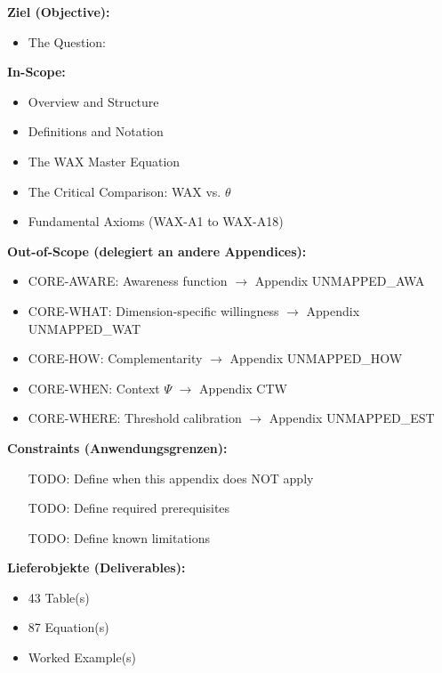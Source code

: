 

\begin{tcolorbox}[
    colback=orange!5!white,
    colframe=orange!75!black,
    title={\textbf{Appendix Scope: Ziel / In-Scope / Out-of-Scope / Constraints}},
    fonttitle=\bfseries
]

\textbf{Ziel (Objective):}
\begin{itemize}[nosep]
    \item The Question:
\end{itemize}

\textbf{In-Scope:}
\begin{itemize}[nosep]
    \item Overview and Structure
    \item Definitions and Notation
    \item The WAX Master Equation
    \item The Critical Comparison: WAX vs. $\theta$
    \item Fundamental Axioms (WAX-A1 to WAX-A18)
\end{itemize}

\textbf{Out-of-Scope (delegiert an andere Appendices):}
\begin{itemize}[nosep]
    \item CORE-AWARE: Awareness function $\rightarrow$ Appendix UNMAPPED_AWA
    \item CORE-WHAT: Dimension-specific willingness $\rightarrow$ Appendix UNMAPPED_WAT
    \item CORE-HOW: Complementarity $\rightarrow$ Appendix UNMAPPED_HOW
    \item CORE-WHEN: Context $\Psi$ $\rightarrow$ Appendix CTW
    \item CORE-WHERE: Threshold calibration $\rightarrow$ Appendix UNMAPPED_EST
\end{itemize}

\textbf{Constraints (Anwendungsgrenzen):}
\begin{itemize}[nosep]
    \item [TODO: Define when this appendix does NOT apply]
    \item [TODO: Define required prerequisites]
    \item [TODO: Define known limitations]
\end{itemize}

\textbf{Lieferobjekte (Deliverables):}
\begin{itemize}[nosep]
    \item 43 Table(s)
    \item 87 Equation(s)
    \item Worked Example(s)
\end{itemize}

\end{tcolorbox}


